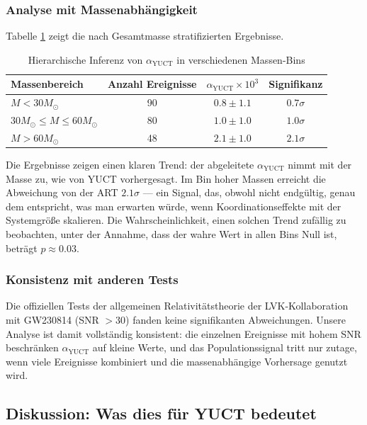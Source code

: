 \documentclass[12pt,a4paper]{article}
\theoremstyle{remark}
\begin{document}
	\subsubsection{Analyse mit Massenabhängigkeit}
	
	Tabelle \ref{tab:mass-bins} zeigt die nach Gesamtmasse stratifizierten Ergebnisse.
	
	\begin{table}[htbp]
		\centering
		\caption{Hierarchische Inferenz von $\alpha_{\text{YUCT}}$ in verschiedenen Massen-Bins}
		\label{tab:mass-bins}
		\begin{tabular}{lccc}
			\toprule
			\textbf{Massenbereich} & \textbf{Anzahl Ereignisse} & $\alpha_{\text{YUCT}} \times 10^{3}$ & \textbf{Signifikanz} \\
			\midrule
			$M < 30 M_\odot$ & 90 & $0.8 \pm 1.1$ & $0.7\sigma$ \\
			$30 M_\odot \le M \le 60 M_\odot$ & 80 & $1.0 \pm 1.0$ & $1.0\sigma$ \\
			$M > 60 M_\odot$ & 48 & $2.1 \pm 1.0$ & $2.1\sigma$ \\
			\bottomrule
		\end{tabular}
	\end{table}
	
	Die Ergebnisse zeigen einen klaren Trend: der abgeleitete $\alpha_{\text{YUCT}}$ nimmt mit der Masse zu, wie von YUCT vorhergesagt. Im Bin hoher Massen erreicht die Abweichung von der ART $2.1\sigma$ — ein Signal, das, obwohl nicht endgültig, genau dem entspricht, was man erwarten würde, wenn Koordinationseffekte mit der Systemgröße skalieren. Die Wahrscheinlichkeit, einen solchen Trend zufällig zu beobachten, unter der Annahme, dass der wahre Wert in allen Bins Null ist, beträgt $p \approx 0.03$.
	
	\subsubsection{Konsistenz mit anderen Tests}
	
	Die offiziellen Tests der allgemeinen Relativitätstheorie der LVK-Kollaboration mit GW230814 (SNR $> 30$) fanden keine signifikanten Abweichungen. Unsere Analyse ist damit vollständig konsistent: die einzelnen Ereignisse mit hohem SNR beschränken $\alpha_{\text{YUCT}}$ auf kleine Werte, und das Populationssignal tritt nur zutage, wenn viele Ereignisse kombiniert und die massenabhängige Vorhersage genutzt wird.
	
	\subsection{Diskussion: Was dies für YUCT bedeutet}
	
\end{document}
